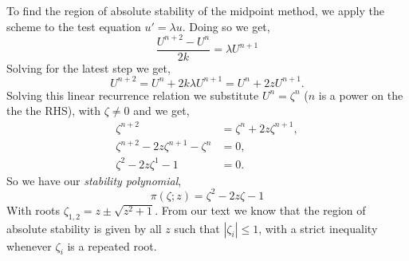 \documentclass[12pt]{article}
\makeatletter
\theoremstyle{homework}
\newenvironment{exercise}[1]
{\def\@currentlabel{#1}\exercisecore}
{\endexercisecore}
\makeatother
\begin{document}
\begin{exercise}{Problem P35}
\begin{enumerate}
      To find the region of absolute stability of the midpoint method, we apply the scheme to the test equation $u' = \lambda u$. Doing so we get, 
      \begin{equation*}
        \dfrac{U^{n + 2} - U^{n}}{2k} = \lambda U^{n+1}
      \end{equation*}
      Solving for the latest step we get, 
      \begin{equation*}
        U^{n + 2} = U^{n} + 2k\lambda U^{n+1} = U^{n} + 2zU^{n+1}.
      \end{equation*}
      Solving this linear recurrence relation we substitute $U^{n} = \zeta^n$ ($n$ is a power on the the the RHS), with $\zeta \neq 0$ and we get, 
      \begin{align*}
        \zeta^{n+2} &=  \zeta^{n} + 2z\zeta^{n+1},\\
        \zeta^{n+2} - 2z\zeta^{n+1} - \zeta^{n}&= 0,\\
        \zeta^{2} - 2z\zeta^{1} - 1 &= 0.
      \end{align*}
      So we have our \emph{stability polynomial}, 
      \begin{equation*}
        \pi(\zeta;z) = \zeta^2 - 2z\zeta - 1
      \end{equation*}
      With roots $\zeta_{1, 2} = z \pm \sqrt{z^2 + 1}$. From our text we know that the region of absolute stability is given by all $z$ such that $|\zeta_i| \leq 1$, with a strict inequality whenever $\zeta_i$ is a repeated root. 
  \end{enumerate}
\end{exercise}
\end{document}
